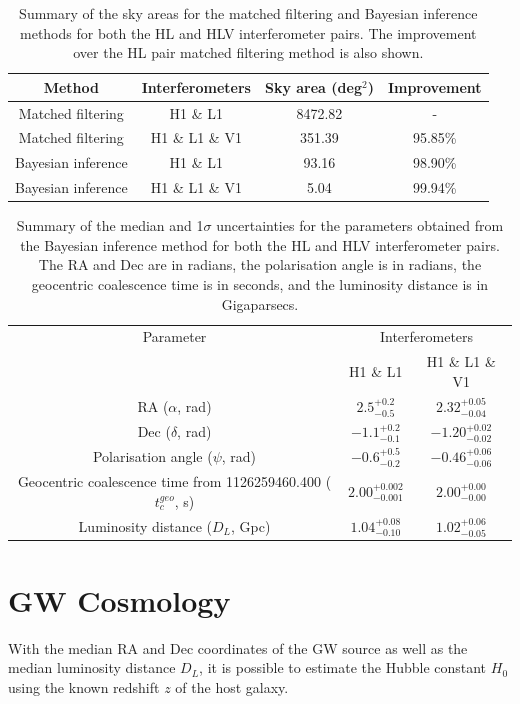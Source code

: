 \documentclass[11pt,a4paper]{article}
\begin{document}
\begin{table}[h]
    \centering
    \begin{tabular}{c|c|c|c}
    Method & Interferometers & Sky area (deg$^2$) & Improvement\\
    \hline
    Matched filtering & H1 \& L1 & 8472.82 & - \\
    Matched filtering & H1 \& L1 \& V1 & 351.39 & 95.85\% \\
    Bayesian inference & H1 \& L1  & 93.16 & 98.90\% \\
    Bayesian inference & H1 \& L1 \& V1 & 5.04 & 99.94\% \\
    \end{tabular}
    \caption{Summary of the sky areas for the matched filtering and Bayesian inference methods for both the HL and HLV interferometer pairs. The improvement over the HL pair matched filtering method is also shown.}
    \label{tab:areas}
\end{table}

\begin{table}[h]
    \centering
    \begin{tabular}{c|c|c}
    Parameter & \multicolumn{2}{c}{Interferometers} \\
    & H1 \& L1 & H1 \& L1 \& V1 \\
    \hline
    RA ($\alpha$, rad) & $2.5^{+0.2}_{-0.5}$ & $2.32^{+0.05}_{-0.04}$ \\
    Dec ($\delta$, rad) & $-1.1^{+0.2}_{-0.1}$ & $-1.20^{+0.02}_{-0.02}$ \\
    Polarisation angle ($\psi$, rad) & $-0.6^{+0.5}_{-0.2}$ & $-0.46^{+0.06}_{-0.06}$ \\
    Geocentric coalescence time from 1126259460.400 ($t_c^{geo}$, s) & $2.00^{+0.002}_{-0.001}$ & $2.00^{+0.00}_{-0.00}$ \\
    Luminosity distance ($D_L$, Gpc) & $1.04^{+0.08}_{-0.10}$ & $1.02^{+0.06}_{-0.05}$ \\
    \end{tabular}
    \caption{Summary of the median and 1$\sigma$ uncertainties for the parameters obtained from the Bayesian inference method for both the HL and HLV interferometer pairs. The RA and Dec are in radians, the polarisation angle is in radians, the geocentric coalescence time is in seconds, and the luminosity distance is in Gigaparsecs.}
    \label{tab:params}
\end{table}
\clearpage
\section{GW Cosmology}
\label{sec:cosmology}
With the median RA and Dec coordinates of the GW source as well as the median luminosity distance $D_L$, it is possible to estimate the Hubble constant $H_0$ using the known redshift $z$ of the host galaxy. 
\end{document}
